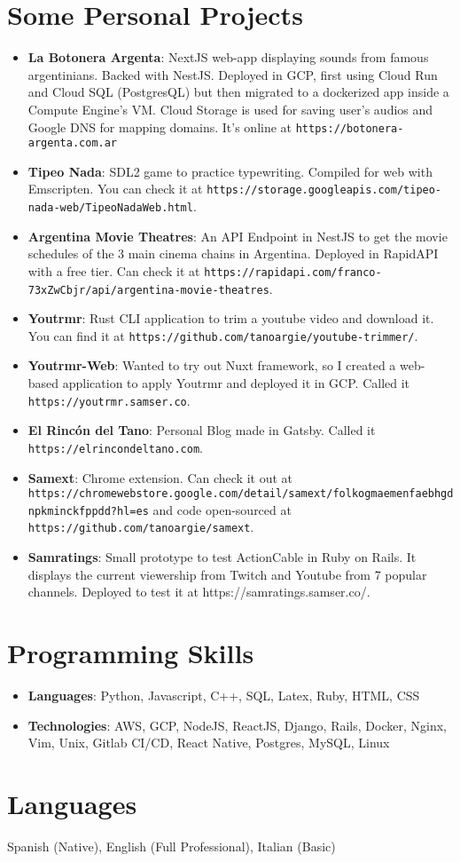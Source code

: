 \documentclass[letterpaper,11pt]{article}
\newcommand{\resumeItem}[2]{
  \item\small{
    \textbf{#1}{: #2 \vspace{-2pt}}
  }
}
\newcommand{\resumeSubItem}[2]{\resumeItem{#1}{#2}\vspace{-4pt}}
\newcommand{\resumeSubHeadingListStart}{\begin{itemize}[leftmargin=*]}
\newcommand{\resumeSubHeadingListEnd}{\end{itemize}}
\begin{document}
\section{Some Personal Projects}
 \resumeSubHeadingListStart
   \resumeSubItem{La Botonera Argenta}
     {NextJS web-app displaying sounds from famous argentinians. Backed with NestJS. Deployed in GCP, first using Cloud Run and Cloud SQL (PostgresQL) but then migrated to a dockerized app inside a Compute Engine's VM. Cloud Storage is used for saving user's audios and Google DNS for mapping domains. It's online at \nolinkurl{https://botonera-argenta.com.ar}}
   \resumeSubItem{Tipeo Nada}
     {SDL2 game to practice typewriting. Compiled for web with Emscripten. You can check it at \nolinkurl{https://storage.googleapis.com/tipeo-nada-web/TipeoNadaWeb.html}.}
   \resumeSubItem{Argentina Movie Theatres}
     {An API Endpoint in NestJS to get the movie schedules of the 3 main cinema chains in Argentina. Deployed in RapidAPI with a free tier. Can check it at \nolinkurl{https://rapidapi.com/franco-73xZwCbjr/api/argentina-movie-theatres}.}
   \resumeSubItem{Youtrmr}
     {Rust CLI application to trim a youtube video and download it. You can find it at \nolinkurl{https://github.com/tanoargie/youtube-trimmer/}.}
   \resumeSubItem{Youtrmr-Web}
     {Wanted to try out Nuxt framework, so I created a web-based application to apply Youtrmr and deployed it in GCP. Called it \nolinkurl{https://youtrmr.samser.co}.}
   \resumeSubItem{El Rincón del Tano}
     {Personal Blog made in Gatsby. Called it \nolinkurl{https://elrincondeltano.com}.}
   \resumeSubItem{Samext}
     {Chrome extension. Can check it out at \nolinkurl{https://chromewebstore.google.com/detail/samext/folkogmaemenfaebhgdnpkminckfppdd?hl=es} and code open-sourced at \nolinkurl{https://github.com/tanoargie/samext}.}
   \resumeSubItem{Samratings}
     {Small prototype to test ActionCable in Ruby on Rails. It displays the current viewership from Twitch and Youtube from 7 popular channels. Deployed to test it at https://samratings.samser.co/.}
 \resumeSubHeadingListEnd


\section{Programming Skills}
  \resumeSubHeadingListStart
    \item{
      \textbf{Languages}{: Python, Javascript, C++, SQL, Latex, Ruby, HTML, CSS}
    }
    \item{
      \textbf{Technologies}{: AWS, GCP, NodeJS, ReactJS, Django, Rails, Docker, Nginx, Vim, Unix, Gitlab CI/CD, React Native, Postgres, MySQL, Linux}
    }
  \resumeSubHeadingListEnd



\section{Languages}
  {Spanish (Native), English (Full Professional), Italian (Basic)}

\end{document}
